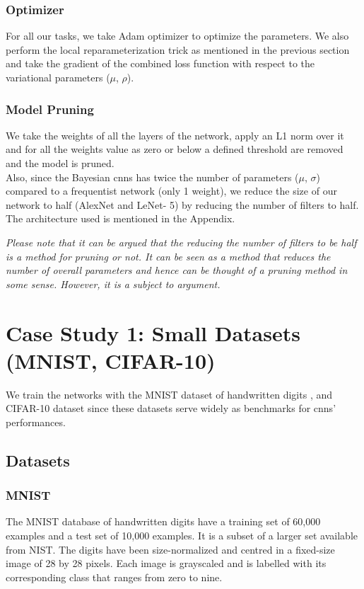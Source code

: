 \subsubsection{Optimizer}

For all our tasks, we take Adam optimizer \cite{kingma2014adam} to optimize the parameters. We also perform the local reparameterization trick as mentioned in the previous section and take the gradient of the combined loss function with respect to the variational parameters ($\mu$, $\rho$).

\subsubsection{Model Pruning}

We take the weights of all the layers of the network, apply an L1 norm over it and for all the weights value as zero or below a defined threshold are removed and the model is pruned. \\ Also, since the Bayesian \acp{cnn} has twice the number of parameters ($\mu$, $\sigma$) compared to a frequentist network (only 1 weight), we reduce the size of our network to half (AlexNet and LeNet- 5) by reducing the number of filters to half. The architecture used is mentioned in the Appendix.

\textit{Please note that it can be argued that the reducing the number of filters to be half is a method for pruning or not. It can be seen as a method that reduces the number of overall parameters and hence can be thought of a pruning method in some sense. However, it is a subject to argument.} 

\section{Case Study 1: Small Datasets (MNIST, CIFAR-10)}

We train the networks with the MNIST dataset of handwritten digits \cite{lecun1998gradient}, and CIFAR-10 dataset \cite{krizhevsky2009learning} since these datasets serve widely as benchmarks for \acp{cnn}' performances. 

\subsection{Datasets}
\newline
\subsubsection{MNIST}
The MNIST database \cite{lecun-mnisthandwrittendigit-2010} of handwritten digits have a training set of 60,000 examples and a test set of 10,000 examples. It is a subset of a larger set available from NIST. The digits have been size-normalized and centred in a fixed-size image of 28 by 28 pixels. Each image is grayscaled and is labelled with its corresponding class that ranges from zero to nine.
\newline

